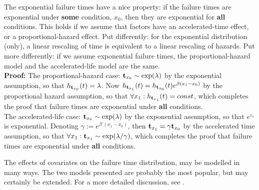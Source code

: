 \begin{example}
The exponential failure times have a nice property:
if the failure times are exponential under \textbf{some} condition, $x_0$, then they are exponential for \textbf{all} conditions. 
This holds if we assume that factors have an accelerated-time effect, or a proportional-hazard effect. 
Put differently: for the exponential distribution (only), a linear rescaling of time is equivalent to a linear rescaling of hazards. 
Put more differently: if we assume exponential failure times, the proportional-hazard model and the accelerated-life model are the same. \\
\textbf{Proof:}
The proportional-hazard case:
$\mathbf{t}_{x_0}\sim \exp(\lambda)$ by the exponential assumption, so that 
$h_{\mathbf{t}_{x_0}} (t)=\lambda$.
Now $h_{\mathbf{t}_{x_1}} (t)=h_{\mathbf{t}_{x_0}} (t) e^{\beta(x_1-x_0)}$ by the proportional hazard assumption, so that $\forall x_1: h_{\mathbf{t}_{x_1}} (t)= const$, which completes the proof that failure times are exponential under \textbf{all} conditions. \\
The accelerated-life case:
$\mathbf{t}_{x_0}\sim \exp(\lambda)$ by the exponential assumption, so that 
$e^{\varepsilon_i}$ is exponential.
Denoting $\gamma:=e^{\beta'(x_1-x_0)}$, then $\mathbf{t}_{x_1} = \gamma \mathbf{t}_{x_0} $ by the accelerated time assumption, so that $\forall x_1: \mathbf{t}_{x_1} \sim \exp(\lambda/\gamma)$, which completes the proof that failure times are exponential under \textbf{all} conditions. 
\end{example}





\begin{extra}
The effects of covariates on the failure time distribution, may be modelled in many ways. 
The two models presented are probably the most popular, but may certainly be extended. 
For a more detailed discussion, see \cite{cox_analysis_1984}.
\end{extra}





